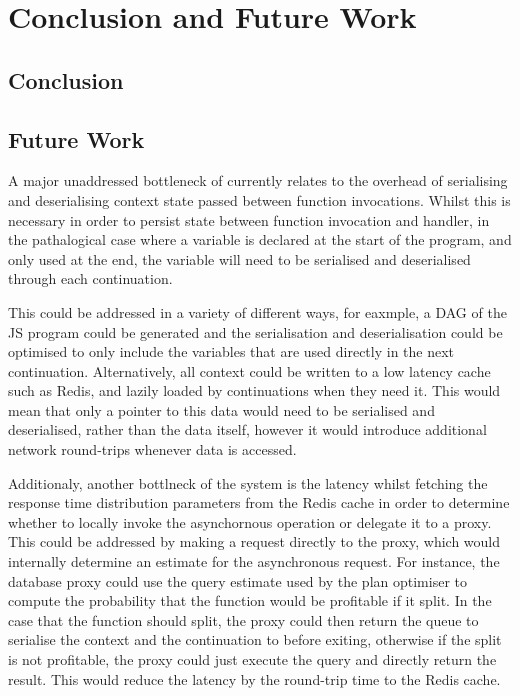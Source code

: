 \chapter{Conclusion and Future Work}
\section{Conclusion}

\section{Future Work}

A major unaddressed bottleneck of \faaas{} currently relates to the overhead of serialising and deserialising context state passed between function invocations. Whilst this is necessary in order to persist state between function invocation and handler, in the pathalogical case where a variable is declared at the start of the program, and only used at the end, the variable will need to be serialised and deserialised through each continuation.

This could be addressed in a variety of different ways, for eaxmple, a DAG of the JS program could be generated and the serialisation and deserialisation could be optimised to only include the variables that are used directly in the next continuation. Alternatively, all context could be written to a low latency cache such as Redis, and lazily loaded by continuations when they need it. This would mean that only a pointer to this data would need to be serialised and deserialised, rather than the data itself, however it would introduce additional network round-trips whenever data is accessed.

Additionaly, another bottlneck of the system is the latency whilst fetching the response time distribution parameters from the Redis cache in order to determine whether to locally invoke the asynchornous operation or delegate it to a proxy. This could be addressed by making a request directly to the proxy, which would internally determine an estimate for the asynchronous request. For instance, the database proxy could use the query estimate used by the plan optimiser to compute the probability that the function would be profitable if it split. In the case that the function should split, the proxy could then return the queue to serialise the context and the continuation to before exiting, otherwise if the split is not profitable, the proxy could just execute the query and directly return the result. This would reduce the latency by the round-trip time to the Redis cache.
